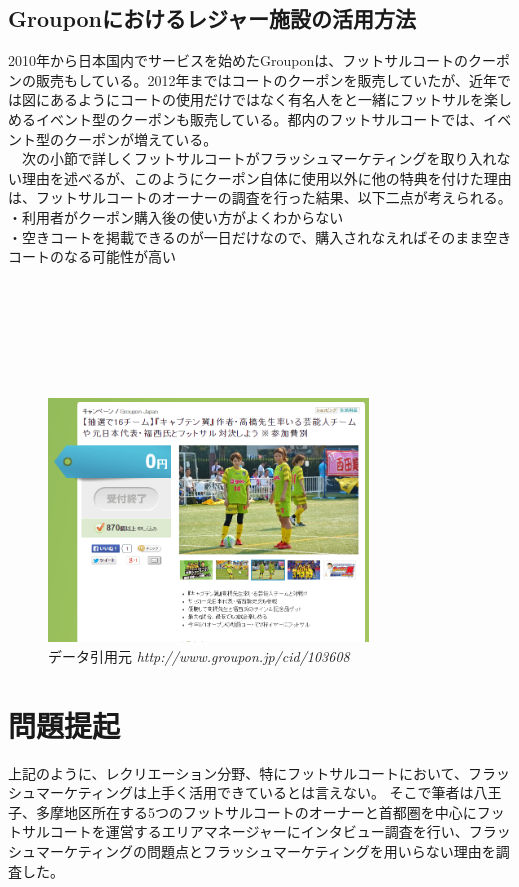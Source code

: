 \subsection{Grouponにおけるレジャー施設の活用方法}
2010年から日本国内でサービスを始めたGrouponは、フットサルコートのクーポンの販売もしている。2012年まではコートのクーポンを販売していたが、近年では図にあるようにコートの使用だけではなく有名人をと一緒にフットサルを楽しめるイベント型のクーポンも販売している。都内のフットサルコートでは、イベント型のクーポンが増えている。
\\　次の小節で詳しくフットサルコートがフラッシュマーケティングを取り入れない理由を述べるが、このようにクーポン自体に使用以外に他の特典を付けた理由は、フットサルコートのオーナーの調査を行った結果、以下二点が考えられる。
\\・利用者がクーポン購入後の使い方がよくわからない
\\・空きコートを掲載できるのが一日だけなので、購入されなえればそのまま空きコートのなる可能性が高い
\\
\\
\\
\\
\\
\\
\\
\begin{figure}[htbp]
	\centering
	\includegraphics[width=85mm, bb=0 0 400 272]{figures/cap.jpg}
	\caption{データ引用元 {\itshape http://www.groupon.jp/cid/103608}}
	\label{www.salon20002.net/monthly/2008/2008-22.pdf}
\end{figure}


\section{問題提起}
上記のように、レクリエーション分野、特にフットサルコートにおいて、フラッシュマーケティングは上手く活用できているとは言えない。
そこで筆者は八王子、多摩地区所在する5つのフットサルコートのオーナーと首都圏を中心にフットサルコートを運営するエリアマネージャーにインタビュー調査を行い、フラッシュマーケティングの問題点とフラッシュマーケティングを用いらない理由を調査した。

